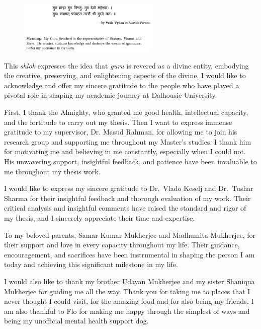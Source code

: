 \documentclass[12pt]{dalthesis}
\begin{document}
\begin{acknowledgements}

\begin{figure}[!htbp]
    \centering
\includegraphics[width = 0.6\textwidth]{images/guru shlok.png}
    \label{fig:guru}
    \vspace{-0.5cm}
\end{figure}

This \textit{shlok} expresses the idea that \textit{guru} is revered as a divine entity, embodying the creative, preserving, and enlightening aspects of the divine. I would like to acknowledge and offer my sincere gratitude to the people who have played a pivotal role in shaping my academic journey at Dalhousie University.

First, I thank the Almighty, who granted me good health, intellectual capacity, and the fortitude to carry out my thesis. Then I want to express immense gratitude to my supervisor, Dr. Masud Rahman, for allowing me to join his research group and supporting me throughout my Master's studies. I thank him for motivating me and believing in me constantly, especially when I could not. His unwavering support, insightful feedback, and patience have been invaluable to me throughout my thesis work.

I would like to express my sincere gratitude to Dr.\ Vlado Keselj and Dr.\ Tushar Sharma for their insightful feedback and thorough evaluation of my work. Their critical analysis and insightful comments have raised the standard and rigor of my thesis, and I sincerely appreciate their time and expertise.

To my beloved parents, Samar Kumar Mukherjee and Madhumita Mukherjee, for their support and love in every capacity throughout my life. Their guidance, encouragement, and sacrifices have been instrumental in shaping the person I am today and achieving this significant milestone in my life.

I would also like to thank my brother Udayan Mukherjee and my sister Shaniqua Mukherjee for guiding me all the way. Thank you for taking me to places that I never thought I could visit, for the amazing food and for also being my friends. I am also thankful to Flo for making me happy through the simplest of ways and being my unofficial mental health support dog. 


\end{acknowledgements}
\end{document}
